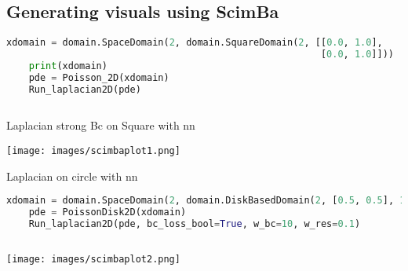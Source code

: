 \documentclass[12pt]{article}
\begin{document}
\newpage

\subsection{Generating visuals using ScimBa}
\begin{lstlisting}[language=Python,caption={},frame=single, backgroundcolor=\color{gray!10}, basicstyle=\footnotesize,rulecolor=\color{blue}, framexleftmargin=3pt, commentstyle=\color{mygreen}, keywordstyle=\color{blue}]
    xdomain = domain.SpaceDomain(2, domain.SquareDomain(2, [[0.0, 1.0], 
                                                        [0.0, 1.0]]))
    print(xdomain)
    pde = Poisson_2D(xdomain)
    Run_laplacian2D(pde)
    
\end{lstlisting}
    
Laplacian strong Bc on Square with nn
\begin{frame}{}
    \begin{center}
        \texttt{[image: images/scimbaplot1.png]}
    \end{center}
\end{frame}
Laplacian on circle with nn
\begin{lstlisting}[language=Python,caption={},frame=single, backgroundcolor=\color{gray!10}, basicstyle=\footnotesize,rulecolor=\color{blue}, framexleftmargin=3pt, commentstyle=\color{mygreen}, keywordstyle=\color{blue}]
    xdomain = domain.SpaceDomain(2, domain.DiskBasedDomain(2, [0.5, 0.5], 1.0))
    pde = PoissonDisk2D(xdomain)
    Run_laplacian2D(pde, bc_loss_bool=True, w_bc=10, w_res=0.1)
    
\end{lstlisting}
\begin{frame}{}
    \begin{center}
        \texttt{[image: images/scimbaplot2.png]}
        \end{center}
\end{frame}

\newpage
\end{document}
